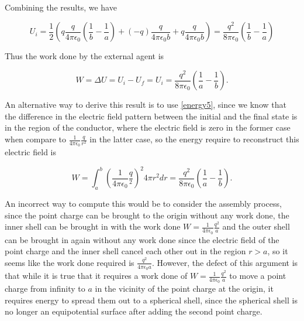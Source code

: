 \documentclass[a4paper,12pt]{report}
\begin{document}
\begin{example_template}
		Combining the results, we have 
		
		\begin{equation}
			U_{i} = \frac{1}{2} (q\frac{q}{4\pi \epsilon_0} (\frac{1}{b} - \frac{1}{a} ) + (-q)\frac{q}{4\pi \epsilon_0 b} + q \frac{q}{4\pi \epsilon_0 b}) = \frac{q^2}{8\pi \epsilon_0} (\frac{1}{b} - \frac{1}{a} ) 
		\end{equation}
		
		Thus the work done by the external agent is
		
		\begin{equation}
			W = \Delta U = U_{i} - U_{f} = U_{i} = \frac{q^2}{8\pi \epsilon_0} (\frac{1}{a} - \frac{1}{b} ) .
		\end{equation}
		
		An alternative way to derive this result is to use \cref{energy5}, since we know that the difference in the electric field pattern between the initial and the final state is in the region of the conductor, where the electric field is zero in the former case when compare to \(\frac{1}{4\pi\epsilon_0} \frac{q}{r^2} \) in the latter case, so the energy require to reconstruct this electric field is 
		
		\begin{equation}
			W = \int_{a}^{b} (\frac{1}{4\pi\epsilon_0} \frac{q}{^2} )^2 4\pi r^2dr =   \frac{q^2}{8\pi \epsilon_0} (\frac{1}{a} - \frac{1}{b} ) .
		\end{equation}
		
		An incorrect way to compute this would be to consider the assembly process, since the point charge can be brought to the origin without any work done, the inner shell can be brought in with the work done \(W = \frac{1}{4\pi\epsilon_0} \frac{q^2}{a} \) and the outer shell can be brought in again without any work done since the electric field of the point charge and the inner shell cancel each other out in the region \(r > a\), so it seems like the work done required is \(\frac{q^2}{4\pi \epsilon_0 a} \). However, the defect of this argument is that while it is true that it requires a work done of \(W = \frac{1}{4\pi\epsilon_0} \frac{q^2}{a} \) to move a point charge from infinity to \(a\) in the vicinity of the point charge at the origin, it requires energy to spread them out to a spherical shell, since the spherical shell is no longer an equipotential surface after adding the second point charge.	
	\end{example_template}
	
	
\end{document}
